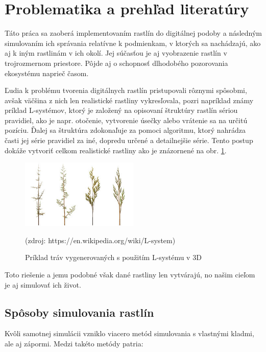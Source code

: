 \documentclass[12pt]{article}
\begin{document}
\section{Problematika a prehľad literatúry}

Táto práca sa zaoberá implementovaním rastlín do digitálnej podoby a následným
simulovaním ich správania relatívne k podmienkam, v ktorých sa nachádzajú,
ako aj k iným rastlinám v ich okolí. Jej súčasťou je aj vyobrazenie
rastlín v trojrozmernom priestore. Pôjde aj o schopnosť dlhodobého
pozorovania ekosystému naprieč časom.

Ľudia k problému tvorenia digitálnych rastlín pristupovali rôznymi spôsobmi,
avšak väčšina z nich len realistické rastliny vykresľovala, pozri napríklad
známy príklad L-systémov, \cite{wiki:L-system}
ktorý je založený na opisovaní štruktúry rastlín
sériou pravidiel, ako je napr. otočenie, vytvorenie úsečky alebo
vrátenie sa na určitú pozíciu. Ďalej sa štruktúra zdokonaľuje za pomoci
algoritmu, ktorý nahrádza časti jej série pravidiel za iné, dopredu určené
a detailnejšie série. Tento postup dokáže vytvoriť celkom realistické rastliny
ako je znázornené na obr. \ref{obr:priklad l-systemu}.

\begin{figure}[ht]
	\centering
	\includegraphics[width=0.5\textwidth]{res/Fractal_weeds.png}
	\caption{Príklad tráv vygenerovaných s použitím L-systému v 3D}

	\footnotesize (zdroj: https://en.wikipedia.org/wiki/L-system)

	\label{obr:priklad l-systemu}
\end{figure}

Toto riešenie a jemu podobné však dané rastliny len vytvárajú, no našim cieľom
je aj simulovať ich život.


\subsection{Spôsoby simulovania rastlín}

Kvôli samotnej simulácii vzniklo viacero metód simulovania s vlastnými kladmi,
ale aj zápormi. Medzi takéto metódy patria:
\end{document}
